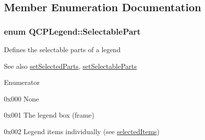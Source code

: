 \subsection{Member Enumeration Documentation}
\hypertarget{class_q_c_p_legend_a5404de8bc1e4a994ca4ae69e2c7072f1}{}
\subsubsection[{Selectable\+Part}]{\setlength{\rightskip}{0pt plus 5cm}enum {\bf Q\+C\+P\+Legend\+::\+Selectable\+Part}}\label{class_q_c_p_legend_a5404de8bc1e4a994ca4ae69e2c7072f1}
Defines the selectable parts of a legend

\begin{DoxySeeAlso}{See also}
\hyperlink{class_q_c_p_legend_a2aee309bb5c2a794b1987f3fc97f8ad8}{set\+Selected\+Parts}, \hyperlink{class_q_c_p_legend_a9ce60aa8bbd89f62ae4fa83ac6c60110}{set\+Selectable\+Parts} 
\end{DoxySeeAlso}
\begin{Desc}
\item[Enumerator]\par
\begin{description}
\item[{\em 
\hypertarget{class_q_c_p_legend_a5404de8bc1e4a994ca4ae69e2c7072f1a378201c07d500af7126e3ec91652eed7}{}sp\+None\label{class_q_c_p_legend_a5404de8bc1e4a994ca4ae69e2c7072f1a378201c07d500af7126e3ec91652eed7}
}]{\ttfamily 0x000} None \item[{\em 
\hypertarget{class_q_c_p_legend_a5404de8bc1e4a994ca4ae69e2c7072f1a0fa4758962a46fa1dc9da818abae23c4}{}sp\+Legend\+Box\label{class_q_c_p_legend_a5404de8bc1e4a994ca4ae69e2c7072f1a0fa4758962a46fa1dc9da818abae23c4}
}]{\ttfamily 0x001} The legend box (frame) \item[{\em 
\hypertarget{class_q_c_p_legend_a5404de8bc1e4a994ca4ae69e2c7072f1a768bfb95f323db4c66473375032c0af7}{}sp\+Items\label{class_q_c_p_legend_a5404de8bc1e4a994ca4ae69e2c7072f1a768bfb95f323db4c66473375032c0af7}
}]{\ttfamily 0x002} Legend items individually (see \hyperlink{class_q_c_p_legend_ac93eaf236e911d67aa8b88942ef45c5e}{selected\+Items}) \end{description}
\end{Desc}


